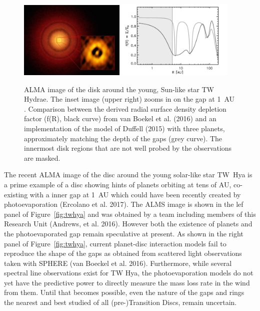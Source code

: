 \documentclass[10pt,fleqn,twoside]{article}
\begin{document}
\begin{figure}
\centerline{\includegraphics[width=0.45\textwidth]{figures/twhya.jpg}
\includegraphics[width=0.5\textwidth]{figures/vanboekel.pdf}}
\caption{ ALMA image of the disk around the young,
  Sun-like star TW Hydrae. The inset image (upper right) zooms in on
  the gap at 1~AU .  Comparison between the derived radial surface density
depletion factor (f(R), black curve) from van Boekel et al. (2016) and an implementation
of the model of Duffell (2015) with three planets, approximately
matching the depth of the gaps (grey curve). The innermost disk
regions that are not well probed by the observations are masked. } 
\end{figure}


The recent ALMA image of the disc around the young solar-like star TW~Hya is a prime example of a disc showing hints of
planets orbiting at tens of AU,  co-existing with a inner gap at 1~AU
which could have been 
recently created by photoevaporation (Ercolano et al. 2017). The ALMS image
is shown in the lef panel of Figure~\ref{fig:twhya} and was obtained by
a team including members of this Research Unit (Andrews, et
al. 2016). However both the existence of planets and the
photoevaporated gap remain speculative at present. As shown in the
right panel of Figure~\ref{fig:twhya}, current planet-disc interaction
models fail to reproduce the shape of the gaps as obtained from
scattered light observations taken with SPHERE (van Boeckel et
al. 2016). Furthermore, while several spectral line observations exist
for TW Hya, the photoevaporation models do not yet have the predictive
power to directly measure the mass loss rate in the wind from
them. Until that becomes possible, even the nature of the gaps and rings
the nearest and best studied of all (pre-)Transition Discs, remain
uncertain. 
\end{document}
